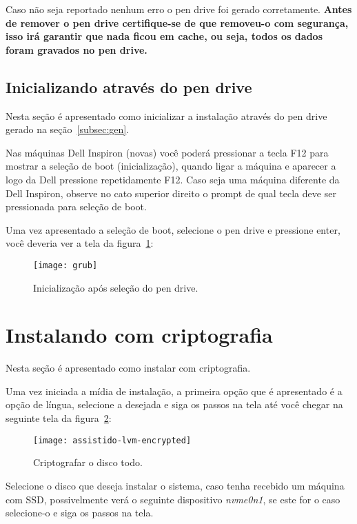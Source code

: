 Caso não seja reportado nenhum erro o pen drive foi gerado
corretamente. \textbf{Antes de remover o pen drive certifique-se de
  que removeu-o com segurança, isso irá garantir que nada ficou em
  cache, ou seja, todos os dados foram gravados no pen drive.}
  
\subsection{Inicializando através do pen drive} \label{subsec:init}
Nesta seção é apresentado como inicializar a instalação através do
pen drive gerado na seção~\ref{subsec:gen}.

Nas máquinas Dell Inspiron (novas) você poderá pressionar a tecla F12 para
mostrar a seleção de boot (inicialização), quando ligar a máquina e
aparecer a logo da Dell pressione repetidamente F12. Caso seja uma
máquina diferente da Dell Inspiron, observe no cato superior direito o
prompt de qual tecla deve ser pressionada para seleção de boot.

Uma vez apresentado a seleção de boot, selecione o pen drive e
pressione enter, você deveria ver a tela da figura~\ref{fig:grub}:

\begin{figure}[H]
  \filcenter
  \texttt{[image: grub]}
  \caption{Inicialização após seleção do pen drive.}
  \label{fig:grub}
\end{figure}


\section{Instalando com criptografia}
Nesta seção é apresentado como instalar com criptografia.

Uma vez iniciada a mídia de instalação, a primeira opção que é
apresentado é a opção de língua, selecione a desejada e siga os passos
na tela até você chegar na seguinte tela da figura~\ref{fig:lvm_encrypt}:

\begin{figure}[H]
  \filcenter
  \texttt{[image: assistido-lvm-encrypted]}
  \caption{Criptografar o disco todo.}
  \label{fig:lvm_encrypt}
\end{figure}

Selecione o disco que deseja instalar o sistema, caso tenha recebido
um máquina com SSD, possivelmente verá o seguinte dispositivo
\emph{nvme0n1}, se este for o caso selecione-o e siga os passos na tela.

